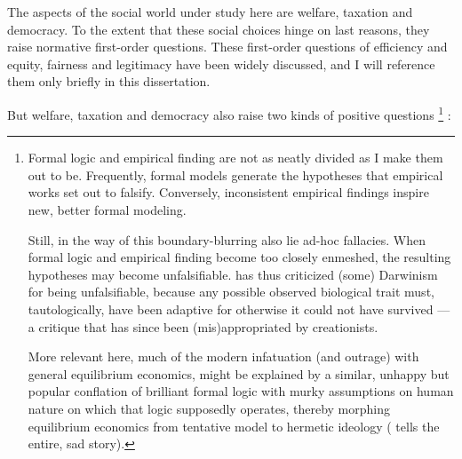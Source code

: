 The aspects of the social world under study here are welfare, taxation and democracy.
To the extent that these social choices hinge on last reasons, they raise normative first-order questions.
These first-order questions of efficiency and equity, fairness and legitimacy have been widely discussed, and I will reference them only briefly in this dissertation. %

But welfare, taxation and democracy also raise two kinds of positive questions
\footnote{
	Formal logic and empirical finding are not as neatly divided as I make them out to be.
	Frequently, formal models generate the hypotheses that empirical works set out to falsify.
	Conversely, inconsistent empirical findings inspire new, better formal modeling.

	Still, in the way of this boundary-blurring also lie ad-hoc fallacies.
	When formal logic and empirical finding become too closely enmeshed, the resulting hypotheses may become unfalsifiable.
	\cite{Popper1976} has thus criticized (some) Darwinism for being unfalsifiable, because any possible observed biological trait must, tautologically, have been adaptive for otherwise it could not have survived --- a critique that has since been (mis)appropriated by creationists.

	More relevant here, much of the modern infatuation (and outrage) with general equilibrium economics, might be explained by a similar, unhappy but popular conflation of brilliant formal logic \citep{Walras1874,Debreu1954} with murky assumptions on human nature on which that logic supposedly operates, thereby morphing equilibrium economics from tentative model to hermetic ideology (\citealt{Cassidy2010} tells the entire, sad story).
}
:

